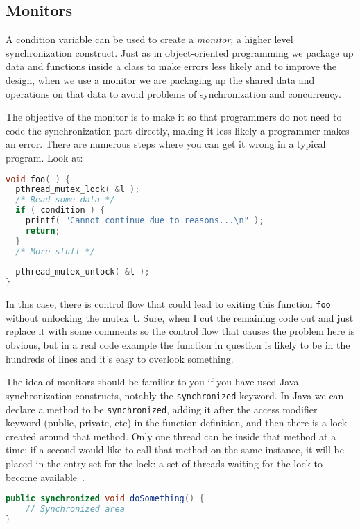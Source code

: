 \subsection*{Monitors}
A condition variable can be used to create a \textit{monitor}, a higher level synchronization construct. Just as in object-oriented programming we package up data and functions inside a class to make errors less likely and to improve the design, when we use a monitor we are packaging up the shared data and operations on that data to avoid problems of synchronization and concurrency.

The objective of the monitor is to make it so that programmers do not need to code the synchronization part directly, making it less likely a programmer makes an error. There are numerous steps where you can get it wrong in a typical program. Look at:

\begin{lstlisting}[language=C]
void foo( ) {
  pthread_mutex_lock( &l );
  /* Read some data */
  if ( condition ) {
    printf( "Cannot continue due to reasons...\n" );
    return;
  }
  /* More stuff */
   
  pthread_mutex_unlock( &l );
}
\end{lstlisting}

In this case, there is control flow that could lead to exiting this function \texttt{foo} without unlocking the mutex \texttt{l}. Sure, when I cut the remaining code out and just replace it with some comments so the control flow that causes the problem here is obvious, but in a real code example the function in question is likely to be in the hundreds of lines and it's easy to overlook something.

The idea of monitors should be familiar to you if you have used Java synchronization constructs, notably the \texttt{synchronized} keyword. In Java we can declare a method to be \texttt{synchronized}, adding it after the access modifier keyword (public, private, etc) in the function definition, and then there is a lock created around that method. Only one thread can be inside that method at a time; if a second would like to call that method on the same instance, it will be placed in the entry set for the lock: a set of threads waiting for the lock to become available~\cite{osc}.

\begin{lstlisting}[language=Java]
public synchronized void doSomething() {
    // Synchronized area
}
\end{lstlisting}


